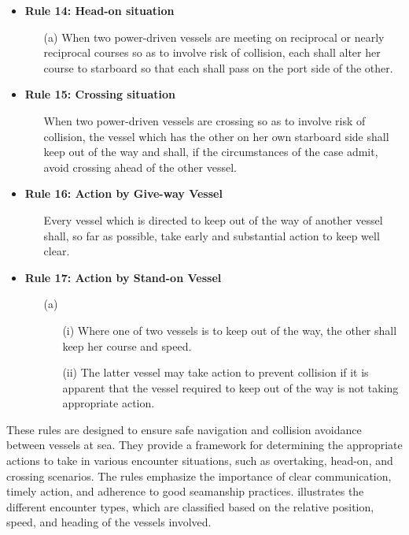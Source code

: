 \begin{itemize}
\begin{enumerate}
        \end{enumerate}
    \item \textbf{Rule 14: Head-on situation}
        \begin{enumerate}
            \item[(a)] When two power-driven vessels are meeting on reciprocal or nearly reciprocal courses so as to involve risk of collision, each shall alter her course to starboard so that each shall pass on the port side of the other.
        \end{enumerate}
    \item \textbf{Rule 15: Crossing situation}
    \begin{enumerate}
        \item[] When two power-driven vessels are crossing so as to involve risk of collision, the vessel which has the other on her own starboard side shall keep out of the way and shall, if the circumstances of the case admit, avoid crossing ahead of the other vessel.
    
    \end{enumerate}
    \item \textbf{Rule 16: Action by Give-way Vessel}
    \begin{enumerate}
        \item [] Every vessel which is directed to keep out of the way of another vessel shall, so far as possible, take early and substantial action to keep well clear.
    \end{enumerate}
    \item \textbf{Rule 17: Action by Stand-on Vessel}
    \begin{enumerate}
        \item[(a)]
        \begin{enumerate}
            \item[(i)] Where one of two vessels is to keep out of the way, the other shall keep her course and speed.
            \item[(ii)] The latter vessel may take action to prevent collision if it is apparent that the vessel required to keep out of the way is not taking appropriate action.
        \end{enumerate}
    \end{enumerate}
\end{itemize}


These rules are designed to ensure safe navigation and collision avoidance between vessels at sea. They provide a framework for determining the appropriate actions to take in various encounter situations, such as overtaking, head-on, and crossing scenarios. The rules emphasize the importance of clear communication, timely action, and adherence to good seamanship practices.  illustrates the different encounter types, which are classified based on the relative position, speed, and heading of the vessels involved. 

